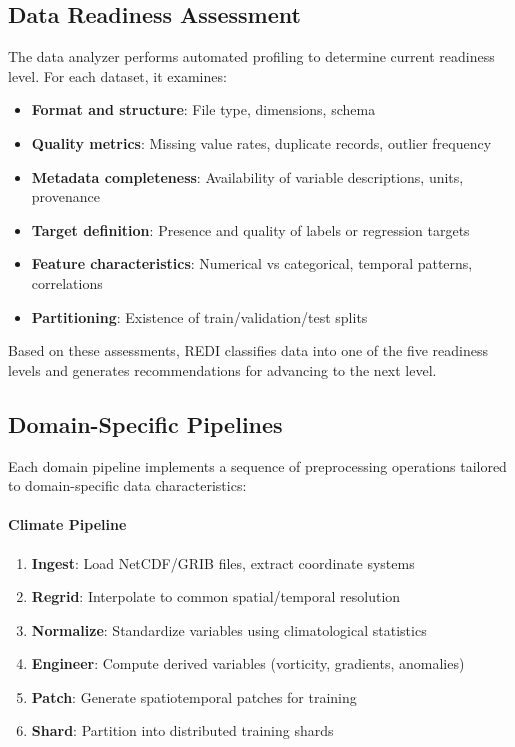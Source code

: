 \documentclass[11pt,letterpaper,twocolumn]{article}
\begin{document}
\subsection{Data Readiness Assessment}

The data analyzer performs automated profiling to determine current readiness level. For each dataset, it examines:

\begin{itemize}
    \item \textbf{Format and structure}: File type, dimensions, schema
    \item \textbf{Quality metrics}: Missing value rates, duplicate records, outlier frequency
    \item \textbf{Metadata completeness}: Availability of variable descriptions, units, provenance
    \item \textbf{Target definition}: Presence and quality of labels or regression targets
    \item \textbf{Feature characteristics}: Numerical vs categorical, temporal patterns, correlations
    \item \textbf{Partitioning}: Existence of train/validation/test splits
\end{itemize}

Based on these assessments, REDI classifies data into one of the five readiness levels and generates recommendations for advancing to the next level.

\subsection{Domain-Specific Pipelines}

Each domain pipeline implements a sequence of preprocessing operations tailored to domain-specific data characteristics:

\paragraph{Climate Pipeline}
\begin{enumerate}
    \item \textbf{Ingest}: Load NetCDF/GRIB files, extract coordinate systems
    \item \textbf{Regrid}: Interpolate to common spatial/temporal resolution
    \item \textbf{Normalize}: Standardize variables using climatological statistics
    \item \textbf{Engineer}: Compute derived variables (vorticity, gradients, anomalies)
    \item \textbf{Patch}: Generate spatiotemporal patches for training
    \item \textbf{Shard}: Partition into distributed training shards
\end{enumerate}
\end{document}
